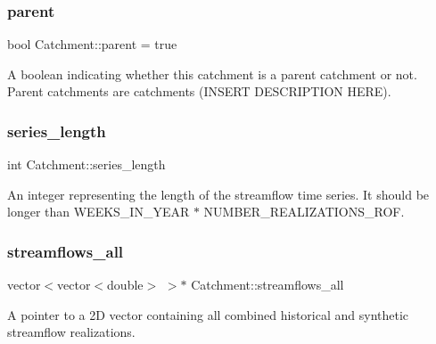 \subsubsection{\texorpdfstring{parent}{parent}}
{\footnotesize\ttfamily bool Catchment\+::parent = true\hspace{0.3cm}{\ttfamily [protected]}}



A boolean indicating whether this catchment is a parent catchment or not. Parent catchments are catchments (I\+N\+S\+E\+RT D\+E\+S\+C\+R\+I\+P\+T\+I\+ON H\+E\+RE). 

\mbox{\label{classCatchment_a2d4994220f63b876348b4ce4892bc6d3}} 
\subsubsection{\texorpdfstring{series\+\_\+length}{series\_length}}
{\footnotesize\ttfamily int Catchment\+::series\+\_\+length\hspace{0.3cm}{\ttfamily [protected]}}



An integer representing the length of the streamflow time series. It should be longer than W\+E\+E\+K\+S\+\_\+\+I\+N\+\_\+\+Y\+E\+AR $\ast$ N\+U\+M\+B\+E\+R\+\_\+\+R\+E\+A\+L\+I\+Z\+A\+T\+I\+O\+N\+S\+\_\+\+R\+OF. 

\mbox{\label{classCatchment_a579ccda86831f286c19c76354e7125c3}} 
\subsubsection{\texorpdfstring{streamflows\+\_\+all}{streamflows\_all}}
{\footnotesize\ttfamily vector$<$vector$<$double$>$ $>$$\ast$ Catchment\+::streamflows\+\_\+all\hspace{0.3cm}{\ttfamily [protected]}}



A pointer to a 2D vector containing all combined historical and synthetic streamflow realizations. 

\mbox{\label{classCatchment_aaf04c295ecd6b666fa1439d3d5bc072a}} 
